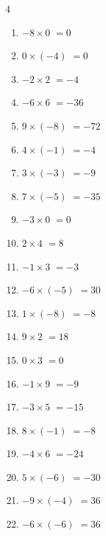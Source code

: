 \begin{multicols}{4}
\begin{enumerate}
  \item $-8\times 0$
        $=0$

  \item $0\times (-4)$
        $=0$

  \item $-2\times 2$
        $=-4$

  \item $-6\times 6$
        $=-36$

  \item $9\times (-8)$
        $=-72$

  \item $4\times (-1)$
        $=-4$

  \item $3\times (-3)$
        $=-9$

  \item $7\times (-5)$
        $=-35$

  \item $-3\times 0$
        $=0$

  \item $2\times 4$
        $=8$

  \item $-1\times 3$
        $=-3$

  \item $-6\times (-5)$
        $=30$

  \item $1\times (-8)$
        $=-8$

  \item $9\times 2$
        $=18$

  \item $0\times 3$
        $=0$

  \item $-1\times 9$
        $=-9$

  \item $-3\times 5$
        $=-15$

\columnbreak %

  \item $8\times (-1)$
        $=-8$

  \item $-4\times 6$
        $=-24$

  \item $5\times (-6)$
        $=-30$

  \item $-9\times (-4)$
        $=36$

  \item $-6\times (-6)$
        $=36$


\end{enumerate}
\end{multicols}
